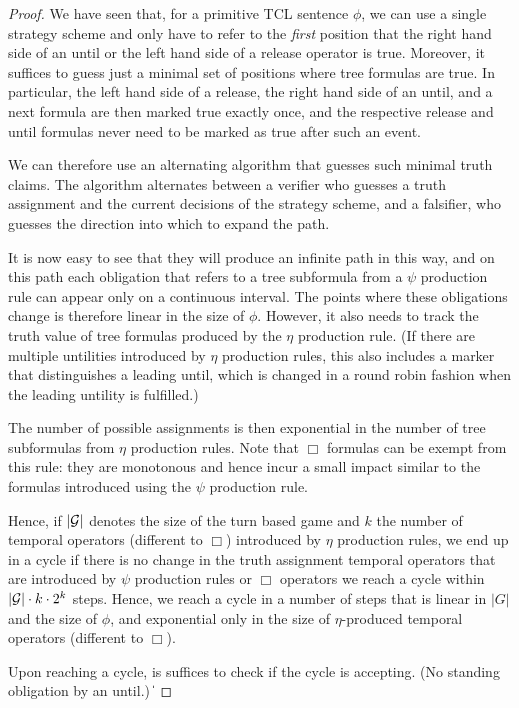 \documentclass{llncs}
\newcommand{\calg}{{\cal G}}
\newcommand{\pfrr}{\Box}
\def\qed{\ifmmode\|\else{\unskip\nobreak\hfil
\penalty50\hskip1em\null\nobreak\hfil$\blacksquare$
\parfillskip=0pt\finalhyphendemerits=0\endgraf}\fi}
\begin{document}
\begin{proof}
We have seen that, for a primitive TCL sentence $\phi$, we can use a single strategy scheme and only have to refer to the \emph{first} position that the right hand side of an until or the left hand side of a release operator is true.
Moreover, it suffices to guess just a minimal set of positions where tree formulas are true.
In particular, the left hand side of a release, the right hand side of an until, and a next formula are then marked true exactly once, and the respective release and until formulas never need to be marked as true after such an event.

We can therefore use an alternating algorithm that guesses such minimal truth claims.
The algorithm alternates between a verifier 
who guesses a truth assignment and 
the current decisions of the strategy scheme, and
a falsifier, who guesses the direction into which to expand the path.

It is now easy to see that they will produce an infinite path in this way, and on this path each obligation that refers to a tree subformula from a $\psi$ production rule can appear only on a continuous interval.
The points where these obligations change is therefore linear in the size of $\phi$.
However, it also needs to track the truth value of tree formulas produced by the $\eta$ production rule. 
(If there are multiple untilities introduced by $\eta$ production rules, this also includes a marker that distinguishes a leading until, which is changed in a round robin fashion when the leading untility is fulfilled.)

The number of possible assignments is then exponential in the number of tree subformulas from $\eta$ production rules. Note that $\pfrr$ formulas can be exempt from this rule: they are monotonous and hence incur a small impact similar to the formulas introduced using the $\psi$ production rule.

Hence, if $|\calg|$ denotes the size of the turn based game and $k$ the number of temporal operators (different to $\pfrr$) introduced by $\eta$ production rules, we end up in a cycle if there is no change in the truth assignment temporal operators that are introduced by $\psi$ production rules or $\pfrr$ operators we reach a cycle within $|\calg| \cdot k \cdot 2^k$ steps.
Hence, we reach a cycle in a number of steps that is linear in $|G|$ and the size of $\phi$, and exponential only in the size of $\eta$-produced temporal operators (different to $\pfrr$).

Upon reaching a cycle, is suffices to check if the cycle is accepting.
(No standing obligation by an until.)
\qed 
\end{proof}
\end{document}
